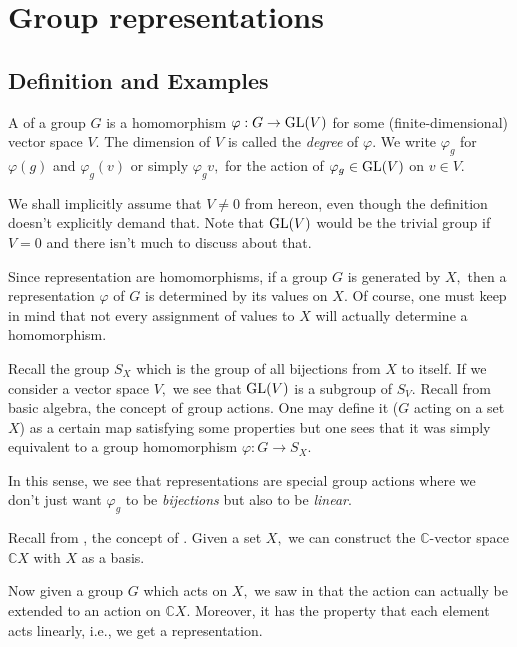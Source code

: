 \section{Group representations}

\subsection{Definition and Examples}
\begin{defn}%
	A  of a group $G$ is a homomorphism $\varphi:G\to \operatorname{GL}(V)$ for some (finite-dimensional) vector space $V.$ The dimension of $V$ is called the \emph{degree} of $\varphi.$ We write $\varphi_g$ for $\varphi(g)$ and $\varphi_g(v)$ or simply $\varphi_gv,$ for the action of $\varphi_g \in \operatorname{GL}(V)$ on $v \in V.$
\end{defn}

\begin{rem}
	We shall implicitly assume that $V \neq 0$ from hereon, even though the definition doesn't explicitly demand that. Note that $\operatorname{GL}(V)$ would be the trivial group if $V = 0$ and there isn't much to discuss about that.
\end{rem}

\begin{rem}
	Since representation are homomorphisms, if a group $G$ is generated by $X,$ then a representation $\varphi$ of $G$ is determined by its values on $X.$ Of course, one must keep in mind that not every assignment of values to $X$ will actually determine a homomorphism. 
\end{rem}

\begin{rem} \label{rem:groupaction}
	Recall the group $S_{X}$ which is the group of all bijections from $X$ to itself. If we consider a vector space $V,$ we see that $\operatorname{GL}(V)$ is a subgroup of $S_V.$ Recall from basic algebra, the concept of group actions. One may define it ($G$ acting on a set $X$) as a certain map satisfying some properties but one sees that it was simply equivalent to a group homomorphism $\varphi:G \to S_X.$ 

	In this sense, we see that representations are special group actions where we don't just want $\varphi_g$ to be \emph{bijections} but also to be \emph{linear}.
\end{rem}

\begin{ex}
	Recall from , the concept of . Given a set $X,$ we can construct the $\mathbb{C}$-vector space $\mathbb{C}X$ with $X$ as a basis.

	Now given a group $G$ which acts on $X,$ we saw in  that the action can actually be extended to an action on $\mathbb{C}X.$ Moreover, it has the property that each element acts linearly, i.e., we get a representation.
\end{ex}

